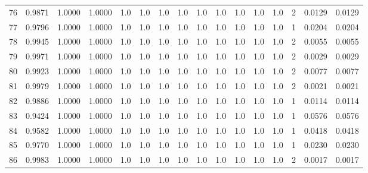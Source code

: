 \begin{tabular}{lrrrrrrrrrrrrrrr}
76  &      0.9871 &  1.0000 &  1.0000 &     1.0 &     1.0 &     1.0 &     1.0 &     1.0 &     1.0 &     1.0 &      1.0 &        1.0 &      2 &                    0.0129 &                     0.0129 \\
77  &      0.9796 &  1.0000 &  1.0000 &     1.0 &     1.0 &     1.0 &     1.0 &     1.0 &     1.0 &     1.0 &      1.0 &        1.0 &      1 &                    0.0204 &                     0.0204 \\
78  &      0.9945 &  1.0000 &  1.0000 &     1.0 &     1.0 &     1.0 &     1.0 &     1.0 &     1.0 &     1.0 &      1.0 &        1.0 &      2 &                    0.0055 &                     0.0055 \\
79  &      0.9971 &  1.0000 &  1.0000 &     1.0 &     1.0 &     1.0 &     1.0 &     1.0 &     1.0 &     1.0 &      1.0 &        1.0 &      2 &                    0.0029 &                     0.0029 \\
80  &      0.9923 &  1.0000 &  1.0000 &     1.0 &     1.0 &     1.0 &     1.0 &     1.0 &     1.0 &     1.0 &      1.0 &        1.0 &      2 &                    0.0077 &                     0.0077 \\
81  &      0.9979 &  1.0000 &  1.0000 &     1.0 &     1.0 &     1.0 &     1.0 &     1.0 &     1.0 &     1.0 &      1.0 &        1.0 &      2 &                    0.0021 &                     0.0021 \\
82  &      0.9886 &  1.0000 &  1.0000 &     1.0 &     1.0 &     1.0 &     1.0 &     1.0 &     1.0 &     1.0 &      1.0 &        1.0 &      1 &                    0.0114 &                     0.0114 \\
83  &      0.9424 &  1.0000 &  1.0000 &     1.0 &     1.0 &     1.0 &     1.0 &     1.0 &     1.0 &     1.0 &      1.0 &        1.0 &      1 &                    0.0576 &                     0.0576 \\
84  &      0.9582 &  1.0000 &  1.0000 &     1.0 &     1.0 &     1.0 &     1.0 &     1.0 &     1.0 &     1.0 &      1.0 &        1.0 &      1 &                    0.0418 &                     0.0418 \\
85  &      0.9770 &  1.0000 &  1.0000 &     1.0 &     1.0 &     1.0 &     1.0 &     1.0 &     1.0 &     1.0 &      1.0 &        1.0 &      1 &                    0.0230 &                     0.0230 \\
86  &      0.9983 &  1.0000 &  1.0000 &     1.0 &     1.0 &     1.0 &     1.0 &     1.0 &     1.0 &     1.0 &      1.0 &        1.0 &      2 &                    0.0017 &                     0.0017 \\

\end{tabular}
